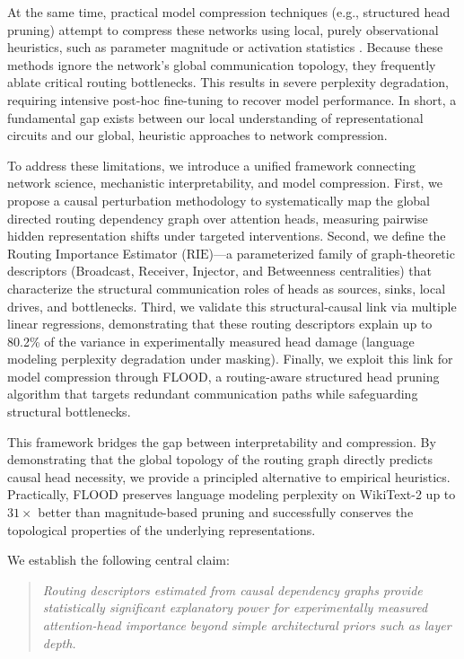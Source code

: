 \documentclass[11pt,a4paper]{article}
\newcommand{\rie}{\text{RIE}}
\theoremstyle{definition}
\theoremstyle{plain}
\begin{document}
At the same time, practical model compression techniques (e.g., structured head pruning) attempt to compress these networks using local, purely observational heuristics, such as parameter magnitude or activation statistics \citep{molchanov2017taylor}. Because these methods ignore the network's global communication topology, they frequently ablate critical routing bottlenecks. This results in severe perplexity degradation, requiring intensive post-hoc fine-tuning to recover model performance. In short, a fundamental gap exists between our local understanding of representational circuits and our global, heuristic approaches to network compression.

To address these limitations, we introduce a unified framework connecting network science, mechanistic interpretability, and model compression. First, we propose a causal perturbation methodology to systematically map the global directed routing dependency graph over attention heads, measuring pairwise hidden representation shifts under targeted interventions. Second, we define the Routing Importance Estimator ($\rie$)---a parameterized family of graph-theoretic descriptors (Broadcast, Receiver, Injector, and Betweenness centralities) that characterize the structural communication roles of heads as sources, sinks, local drives, and bottlenecks. Third, we validate this structural-causal link via multiple linear regressions, demonstrating that these routing descriptors explain up to 80.2\% of the variance in experimentally measured head damage (language modeling perplexity degradation under masking). Finally, we exploit this link for model compression through FLOOD, a routing-aware structured head pruning algorithm that targets redundant communication paths while safeguarding structural bottlenecks.

This framework bridges the gap between interpretability and compression. By demonstrating that the global topology of the routing graph directly predicts causal head necessity, we provide a principled alternative to empirical heuristics. Practically, FLOOD preserves language modeling perplexity on WikiText-2 up to $31\times$ better than magnitude-based pruning and successfully conserves the topological properties of the underlying representations.

We establish the following central claim:
\begin{quote}
\itshape
Routing descriptors estimated from causal dependency graphs provide statistically significant explanatory power for experimentally measured attention-head importance beyond simple architectural priors such as layer depth.
\end{quote}
\end{document}
